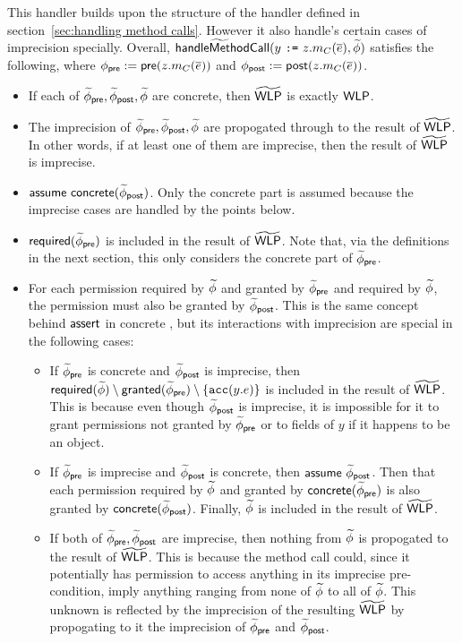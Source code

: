 This handler builds upon the structure of the handler defined in section~\ref{sec:handling method calls}. However it also handle's certain cases of imprecision specially. Overall, $\GhandleMethodCall(y \ \code{:=} \ z.m_C(\vec{e}), \tphi)$ satisfies the following, where $\phi_\textsf{pre} := \textsf{pre}(z.m_C(\overline{e}))$ and $\phi_\textsf{post} := \textsf{post}(z.m_C(\overline{e}))$.
\begin{itemize}

\item
  If each of $\widetilde{\phi}_\textsf{pre}, \widetilde{\phi}_\textsf{post}, \widetilde{\phi}$ are concrete, then $\widetilde{\textsf{WLP}}$ is exactly $\textsf{WLP}$.

\item
  The imprecision of $\widetilde{\phi}_\textsf{pre}, \widetilde{\phi}_\textsf{post}, \widetilde{\phi}$ are propogated through to the result of $\widetilde{\textsf{WLP}}$. In other words, if at least one of them are imprecise, then the result of $\widetilde{\textsf{WLP}}$ is imprecise.

\item
  $\tsf{assume} \ \conc{\tphi_\post}$. Only the concrete part is assumed because the imprecise cases are handled by the points below.

\item
  $\textsf{required}(\widetilde{\phi}_\textsf{pre})$ is included in the result of $\widetilde{\textsf{WLP}}$. Note that, via the definitions in the next section, this only considers the concrete part of $\widetilde{\phi}_\textsf{pre}$.

\item
  For each permission required by $\widetilde{\phi}$ and granted by $\widetilde{\phi}_\textsf{pre}$ and required by $\widetilde{\phi}$, the permission must also be granted by $\widetilde{\phi}_\textsf{post}$. This is the same concept behind $\textsf{assert}$ in concrete , but its interactions with imprecision are special in the following cases:
  \begin{itemize}
    \item
      If $\widetilde{\phi}_\textsf{pre}$ is concrete and $\widetilde{\phi}_\textsf{post}$ is imprecise, then $\textsf{required}(\widetilde{\phi}) \setminus \textsf{granted}(\widetilde{\phi}_\textsf{pre}) \setminus \left\{  \texttt{acc}(y.e)  \right\}$ is included in the result of $\widetilde{\textsf{WLP}}$.
      This is because even though $\widetilde{\phi}_\textsf{post}$ is imprecise, it is impossible for it to grant permissions not granted by $\widetilde{\phi}_\textsf{pre}$ or to fields of $y$ if it happens to be an object.

    \item
      If $\widetilde{\phi}_\textsf{pre}$ is imprecise and $\widetilde{\phi}_\textsf{post}$ is concrete, then $\textsf{assume} \ \widetilde{\phi}_\textsf{post}$.
      Then  that each permission required by $\widetilde{\phi}$ and granted by $\textsf{concrete}(\widetilde{\phi}_\textsf{pre})$ is also granted by $\textsf{concrete}(\widetilde{\phi}_\textsf{post})$.
      Finally, $\widetilde{\phi}$ is included in the result of $\widetilde{\textsf{WLP}}$.

    \item
      If both of $\widetilde{\phi}_\textsf{pre}, \widetilde{\phi}_\textsf{post}$ are imprecise, then nothing from $\widetilde{\phi}$ is propogated to the result of $\widetilde{\textsf{WLP}}$. This is because the method call could, since it potentially has permission to access anything in its imprecise pre-condition, imply anything ranging from none of $\widetilde{\phi}$ to all of $\widetilde{\phi}$. This unknown is reflected by the imprecision of the resulting $\widetilde{\textsf{WLP}}$ by propogating to it the imprecision of $\widetilde{\phi}_\textsf{pre}$ and $\widetilde{\phi}_\textsf{post}$.
  \end{itemize}

\end{itemize}

